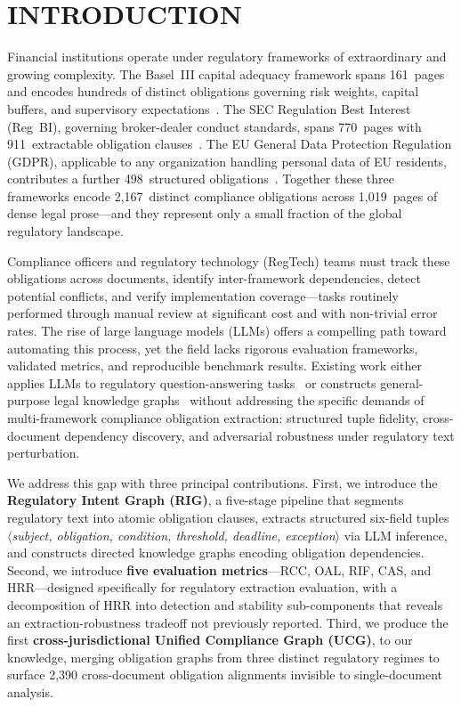 \documentclass{article}
\begin{document}
\section{INTRODUCTION}

Financial institutions operate under regulatory frameworks of extraordinary
and growing complexity.
The Basel~III capital adequacy framework spans 161~pages and encodes
hundreds of distinct obligations governing risk weights, capital buffers,
and supervisory expectations~\cite{bis2017}.
The SEC Regulation Best Interest (Reg~BI), governing broker-dealer conduct
standards, spans 770~pages with 911~extractable obligation
clauses~\cite{sec2019}.
The EU General Data Protection Regulation (GDPR), applicable to any
organization handling personal data of EU residents, contributes a further
498~structured obligations~\cite{gdpr2016}.
Together these three frameworks encode 2,167~distinct compliance obligations
across 1,019~pages of dense legal prose---and they represent only a small
fraction of the global regulatory landscape.

Compliance officers and regulatory technology (RegTech) teams must track
these obligations across documents, identify inter-framework dependencies,
detect potential conflicts, and verify implementation coverage---tasks
routinely performed through manual review at significant cost and with
non-trivial error rates.
The rise of large language models (LLMs) offers a compelling path toward
automating this process, yet the field lacks rigorous evaluation frameworks,
validated metrics, and reproducible benchmark results.
Existing work either applies LLMs to regulatory question-answering
tasks~\cite{cao2024} or constructs general-purpose legal knowledge
graphs~\cite{pan2024} without addressing the specific demands of
multi-framework compliance obligation extraction: structured tuple fidelity,
cross-document dependency discovery, and adversarial robustness under
regulatory text perturbation.

We address this gap with three principal contributions.
First, we introduce the \textbf{Regulatory Intent Graph (RIG)}, a
five-stage pipeline that segments regulatory text into atomic obligation
clauses, extracts structured six-field tuples
$\langle$\textit{subject, obligation, condition, threshold, deadline,
exception}$\rangle$ via LLM inference, and constructs directed knowledge
graphs encoding obligation dependencies.
Second, we introduce \textbf{five evaluation metrics}---RCC, OAL,
RIF, CAS, and HRR---designed specifically for regulatory extraction
evaluation, with a decomposition of HRR into detection and stability
sub-components that reveals an extraction-robustness tradeoff not
previously reported.
Third, we produce the first \textbf{cross-jurisdictional Unified Compliance
Graph (UCG)}, to our knowledge, merging obligation graphs from three distinct regulatory
regimes to surface 2,390 cross-document obligation alignments invisible to
single-document analysis.
\end{document}
